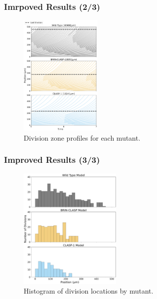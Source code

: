 \documentclass{beamer}
\begin{document}
\begin{frame}
\frametitle{Imrpoved Results (2/3)}
\begin{figure}
  \centering
  \includegraphics[height=16em]{column-modified-profile.pdf}
  \caption{Division zone profiles for each mutant.}
\end{figure}
\end{frame}

\begin{frame}
\frametitle{Improved Results (3/3)}
\begin{figure}
  \centering
  \includegraphics[height=16em]{column-modified-histogram.pdf}
  \caption{Histogram of division locations by mutant.}
\end{figure}
\end{frame}
\end{document}
